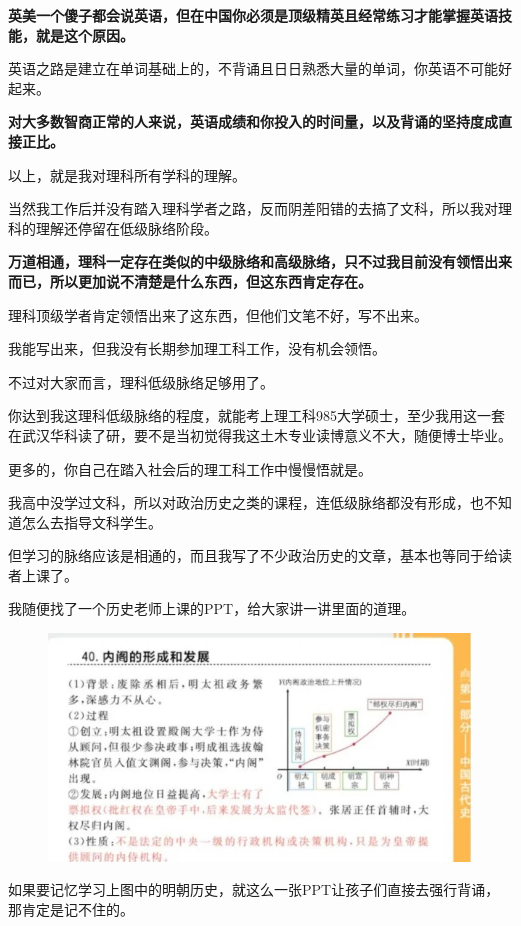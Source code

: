 \documentclass[UTF8, 11pt, oneside]{ctexart}
\newcommand{\zd}[1]{\textbf{\textcolor[RGB]{123,12,0}{#1}}} %
\begin{document}
\zd{英美一个傻子都会说英语，但在中国你必须是顶级精英且经常练习才能掌握英语技能，就是这个原因。}

英语之路是建立在单词基础上的，不背诵且日日熟悉大量的单词，你英语不可能好起来。

\zd{对大多数智商正常的人来说，英语成绩和你投入的时间量，以及背诵的坚持度成直接正比。}

以上，就是我对理科所有学科的理解。

当然我工作后并没有踏入理科学者之路，反而阴差阳错的去搞了文科，所以我对理科的理解还停留在低级脉络阶段。

\zd{万道相通，理科一定存在类似的中级脉络和高级脉络，只不过我目前没有领悟出来而已，所以更加说不清楚是什么东西，但这东西肯定存在。}

理科顶级学者肯定领悟出来了这东西，但他们文笔不好，写不出来。

我能写出来，但我没有长期参加理工科工作，没有机会领悟。

不过对大家而言，理科低级脉络足够用了。

你达到我这理科低级脉络的程度，就能考上理工科985大学硕士，至少我用这一套在武汉华科读了研，要不是当初觉得我这土木专业读博意义不大，随便博士毕业。

更多的，你自己在踏入社会后的理工科工作中慢慢悟就是。

我高中没学过文科，所以对政治历史之类的课程，连低级脉络都没有形成，也不知道怎么去指导文科学生。

但学习的脉络应该是相通的，而且我写了不少政治历史的文章，基本也等同于给读者上课了。

我随便找了一个历史老师上课的PPT，给大家讲一讲里面的道理。

\begin{figure}[H]
    \centering
    \includegraphics[width=13cm]{2024-07-30-001}
\end{figure}


如果要记忆学习上图中的明朝历史，就这么一张PPT让孩子们直接去强行背诵，那肯定是记不住的。
\end{document}
